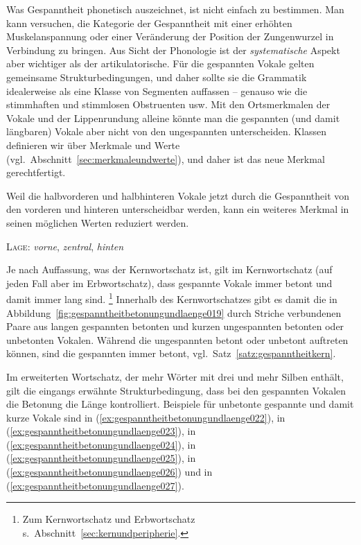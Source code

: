 Was Gespanntheit phonetisch auszeichnet, ist nicht einfach zu bestimmen.
Man kann versuchen, die Kategorie der Gespanntheit mit einer erhöhten Muskelanspannung oder einer Veränderung der Position der Zungenwurzel in Verbindung zu bringen.
Aus Sicht der Phonologie ist der \textit{systematische} Aspekt aber wichtiger als der artikulatorische.
Für die gespannten Vokale gelten gemeinsame Strukturbedingungen, und daher sollte sie die Grammatik idealerweise als eine Klasse von Segmenten auffassen -- genauso wie die stimmhaften und stimmlosen Obstruenten usw.
Mit den Ortsmerkmalen der Vokale und der Lippenrundung alleine könnte man die gespannten (und damit längbaren) Vokale aber nicht von den ungespannten unterscheiden.
Klassen definieren wir über Merkmale und Werte (vgl.\ Abschnitt~\ref{sec:merkmaleundwerte}), und daher ist das neue Merkmal gerechtfertigt.

Weil die halbvorderen und halbhinteren Vokale jetzt durch die Gespanntheit von den vorderen und hinteren unterscheidbar werden, kann ein weiteres Merkmal in seinen möglichen Werten reduziert werden.

\begin{exe}
  \ex \textsc{Lage}: \textit{vorne}, \textit{zentral}, \textit{hinten}
\end{exe}

Je nach Auffassung, was der Kernwortschatz ist, gilt im Kernwortschatz (auf jeden Fall aber im Erbwortschatz), dass gespannte Vokale immer betont und damit immer lang sind.%
\footnote{Zum Kernwortschatz und Erbwortschatz s.\ Abschnitt~\ref{sec:kernundperipherie}.}
Innerhalb des Kernwortschatzes gibt es damit die in Abbildung~\ref{fig:gespanntheitbetonungundlaenge019} durch Striche verbundenen Paare aus langen gespannten betonten und kurzen ungespannten betonten oder unbetonten Vokalen.
Während die ungespannten betont oder unbetont auftreten können, sind die gespannten immer betont, vgl.\ Satz~\ref{satz:gespanntheitkern}.


Im erweiterten Wortschatz, der mehr Wörter mit drei und mehr Silben enthält, gilt die eingangs erwähnte Strukturbedingung, dass bei den gespannten Vokalen die Betonung die Länge kontrolliert.
Beispiele für unbetonte gespannte und damit kurze Vokale sind \textipa{[i]} in (\ref{ex:gespanntheitbetonungundlaenge022}), \textipa{[e]} in (\ref{ex:gespanntheitbetonungundlaenge023}), \textipa{[u]} in (\ref{ex:gespanntheitbetonungundlaenge024}), \textipa{[o]} in (\ref{ex:gespanntheitbetonungundlaenge025}), \textipa{[\o]} in (\ref{ex:gespanntheitbetonungundlaenge026}) und \textipa{[y]} in (\ref{ex:gespanntheitbetonungundlaenge027}).

